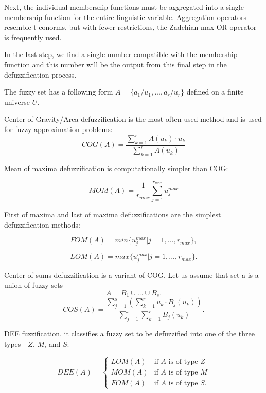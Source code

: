 Next, the individual membership functions must be aggregated
into a single membership function for the entire linguistic variable. Aggregation
operators resemble t-conorms, but with fewer restrictions, the Zadehian max OR operator is frequently used.

In the last step, we find a single number compatible with the membership function
and this number will be the output from this final step in the
defuzzification process.\cite{FesFr}

The fuzzy set has a following form \(A =\{a_1 / u_1, ... , a_r / u_r \} \) defined on a finite universe \(U\).\cite{NOPEDV16}

Center of Gravity/Area defuzzification is the most often used method and is used for fuzzy approximation problems:
\[COG(A)=\frac{{\sum_{k=1}^r {A(u_k)\cdot u_k}}}{\sum_{k=1}^r {A(u_k)}}\]

Mean of maxima defuzzification is computationally simpler than COG:

\[MOM(A)=\frac{1}{r_{max}}\sum_{j=1}^{r_{max}} {u_j^{max}}\]

First of maxima and last of maxima defuzzifications are the simplest defuzzification methods:

\[FOM(A) = min\{u_j^{max}| j= 1, ...,r_{max}\},\]

\[LOM(A) = max\{u_j^{max}| j= 1, ...,r_{max}\}.\]

Center of sums defuzzification is a variant of COG. Let us assume that set a is a union of fuzzy sets
\[A=B_1\cup ... \cup B_s .\]
\[COS(A)=\frac{\sum_{j=1}^{s} {(\sum_{k=1}^{r} {u_k\cdot B_j (u_k)})}}{\sum_{j=1}^{s} {\sum_{k=1}^{r} {B_j (u_k)}}}.\]

DEE fuzzification, it classifies a fuzzy set to
be defuzzified into one of the three types—\(Z\), \(M\), and \(S\):

\[
  DEE(A)=
  \begin{cases}
    LOM(A) &\text{if $A$ is of type $Z$} \\
    MOM(A) &\text{if $A$ is of type $M$}\\
    FOM(A) &\text{if $A$ is of type $S$}.
  \end{cases}
\]


